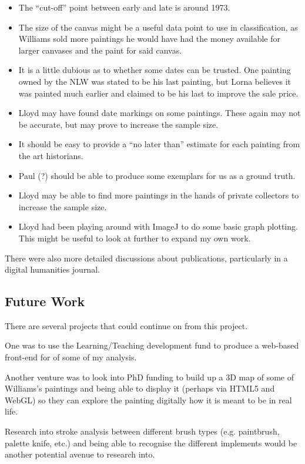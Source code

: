 \begin{itemize}
\item The ``cut-off'' point between early and late is around 1973.
\item The size of the canvas might be a useful data point to use in classification, as Williams sold
more paintings he would have had the money available for larger canvases and the paint for said
canvas.
\item It is a little dubious as to whether some dates can be trusted. One painting owned by the
NLW was stated to be his last painting, but Lorna believes it was painted much earlier and claimed
to be his last to improve the sale price.
\item Lloyd may have found date markings on some paintings. These again may not be accurate, but
may prove to increase the sample size.
\item It should be easy to provide a ``no later than'' estimate for each painting from the art
historians.
\item Paul (?) should be able to produce some exemplars for us as a ground truth.
\item Lloyd may be able to find more paintings in the hands of private collectors to increase the 
sample size.
\item Lloyd had been playing around with ImageJ to do some basic graph plotting. This might be 
useful to look at further to expand my own work.
\end{itemize}

There were also more detailed discussions about publications, particularly in a digital humanities
journal.


\subsection{Future Work}

There are several projects that could continue on from this project.

One was to use the Learning/Teaching development fund to produce a web-based front-end for of some
of my analysis.

Another venture was to look into PhD funding to build up a 3D map of some of Williams's paintings
and being able to display it (perhaps via HTML5 and WebGL) so they can explore the painting 
digitally how it is meant to be in real life.

Research into stroke analysis between different brush types (e.g. paintbrush, palette knife, etc.)
and being able to recognise the different implements would be another potential avenue to research
into.


